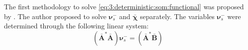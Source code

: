 			The first methodology to solve \eqref{eq:3:deterministic:som:functional} was proposed by \cite{chen2009three}. The author proposed to solve $\boldsymbol{\nu}^-_s$ and $\boldsymbol{\bar{\chi}}$ separately. The variables $\boldsymbol{\nu}^-_s$ were determined through the following linear system:
			\begin{equation}
				\left(\mathbf{\bar{A}^*\mathbf{\bar{A}}}\right)\boldsymbol{\nu}^-_s = \left(\mathbf{\bar{A}^*\mathbf{\bar{B}}}\right) \label{eq:3:deterministic:som:nusolution}
			\end{equation}
		
